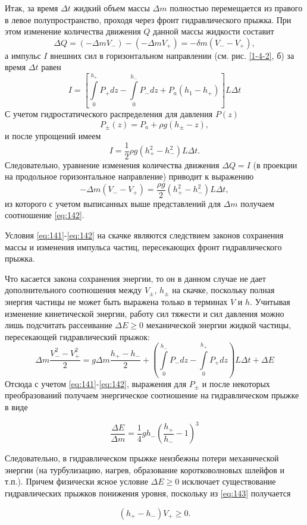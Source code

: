 \documentclass[specialist, subf, href, colorlinks=true, 14pt, final]{disser}
\theoremstyle{definition}
\begin{document}
Итак, за время $\Delta t$ жидкий объем массы $\Delta m$ полностью перемещается из правого в левое полупространство, проходя через фронт гидравлического прыжка. При этом изменение количества движения $Q$ данной массы жидкости составит
\[
  \Delta Q = (-\Delta m V_{-}) - (-\Delta m V_{+}) = -\delta m (V_{-} - V_{+}),
\]
а импульс $I$ внешних сил в горизонтальном направлении (см. рис. \ref{1-4-2}, б) за время $\Delta t$ равен
\[
  I = \left[\int\limits_{0}^{h_{+}}P_{+}dz - \int\limits_{0}^{h_{-}}P_{-}dz + P_{a}(h_{1}-h_{+})\right] L \Delta t
\]
С учетом гидростатического распределения для давления $P(z)$
\[
  P_{\pm}(z) = P_{a} + \rho g (h_{\pm} - z),
\]
и после упрощений имеем
\[
  I = \frac{1}{2}\rho g (h_{+}^{2} - h_{-}^{2}) L \Delta t.
\]
Следовательно, уравнение изменения количества движения $\Delta Q = I$ (в проекции на продольное горизонтальное направление) приводит к выражению
\[
  -\Delta m (V_{-} - V_{+}) = \frac{\rho g}{2} (h_{+}^{2} - h_{-}^{2}) L \Delta t,
\]
из которого с учетом выписанных выше представлений для $\Delta m$ получаем соотношение \eqref{eq:142}.

Условия \eqref{eq:141}-\eqref{eq:142} на скачке являются следствием законов сохранения массы и изменения импульса частиц, пересекающих фронт гидравлического прыжка.

Что касается закона сохранения энергии, то он в данном  случае не дает дополнительного соотношения между $V_{\pm}$, $h_{\pm}$ на скачке, поскольку полная энергия частицы не может быть выражена только в терминах $V$ и $h$. Учитывая изменение кинетической энергии, работу сил тяжести и сил давления можно лишь подсчитать рассеивание $\Delta E \geqslant 0$ механической энергии жидкой частицы, пересекающей гидравлический прыжок:
\[
  \Delta m \frac{V_{-}^{2} - V_{+}^{2}}{2} = g\Delta m \frac{h_{+} - h_{-}}{2} + \left( \int\limits_{0}^{h_{-}}P_{-}dz - \int\limits_{0}^{h_{+}}P_{+}dz \right) L \Delta t + \Delta E
\]
Отсюда с учетом \eqref{eq:141}-\eqref{eq:142}, выражения для $P_{\pm}$ и после некоторых преобразований получаем энергическое соотношение на  гидравлическом прыжке в виде
\addtocounter{equation}{1}
\begin{equation}\label{eq:143}
  \frac{\Delta E}{\Delta m} = \frac{1}{4}gh_{-}\left(\frac{h_+}{h_-} - 1\right)^3
  \tag{3}
\end{equation}

Следовательно, в гидравлическом прыжке неизбежны потери механической энергии (на турбулизацию, нагрев, образование коротковолновых шлейфов и т.п.). Причем физически ясное условие $\Delta E \geqslant 0$ исключает существование гидравлических прыжков понижения уровня, поскольку из \eqref{eq:143} получается
\addtocounter{equation}{1}
\begin{equation}\label{eq:144}
  (h_{+} - h_{-})V_{+} \geqslant 0.
  \tag{4}
\end{equation}
\end{document}
